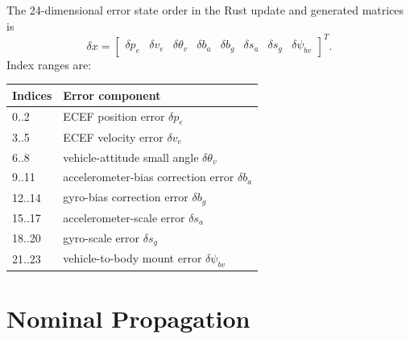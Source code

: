 \documentclass[11pt]{article}
\newcommand{\T}{^{T}}
\begin{document}
The 24-dimensional error state order in the Rust update and generated matrices
is
\begin{equation}
  \delta x =
  \begin{bmatrix}
  \delta p_e &
  \delta v_e &
  \delta\theta_v &
  \delta b_a &
  \delta b_g &
  \delta s_a &
  \delta s_g &
  \delta\psi_{bv}
  \end{bmatrix}\T .
\end{equation}
Index ranges are:
\begin{center}
\begin{tabular}{ll}
\toprule
Indices & Error component \\
\midrule
0..2 & ECEF position error \(\delta p_e\) \\
3..5 & ECEF velocity error \(\delta v_e\) \\
6..8 & vehicle-attitude small angle \(\delta\theta_v\) \\
9..11 & accelerometer-bias correction error \(\delta b_a\) \\
12..14 & gyro-bias correction error \(\delta b_g\) \\
15..17 & accelerometer-scale error \(\delta s_a\) \\
18..20 & gyro-scale error \(\delta s_g\) \\
21..23 & vehicle-to-body mount error \(\delta\psi_{bv}\) \\
\bottomrule
\end{tabular}
\end{center}

\section{Nominal Propagation}
\end{document}

